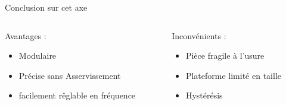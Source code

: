 \documentclass{beamer}
\begin{document}
\begin{frame}{Conclusion sur cet axe}
	\begin{columns}
		\begin{column}{0.3\textwidth}
			Avantages : 
			\begin{itemize}
				\item Modulaire
				\item Précise sans Asservissement
				\item facilement rêglable en fréquence
			\end{itemize}
		\end{column}
		\begin{column}{0.3\textwidth}
			Inconvénients : 
			\begin{itemize}
				\item Pièce fragile à l'usure
				\item Plateforme limité en taille
				\item Hystérésis
			\end{itemize}
			

\end{column}
\end{columns}
\end{frame}
\end{document}
